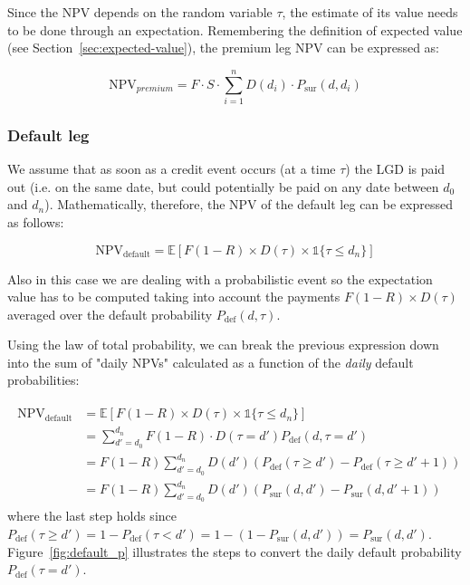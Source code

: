 Since the NPV depends on the random variable $\tau$, the estimate of its value needs to be done through an expectation.
Remembering the definition of expected value (see Section~\ref{sec:expected-value}), %
the premium leg NPV can be expressed as:

\begin{equation}
	\textrm{NPV}_{premium} = F\cdot S \cdot \sum_{i=1}^{n} D(d_i) \cdot P_{\textrm{sur}}(d, d_i)
\end{equation}

\subsubsection{Default leg}\label{default-leg}

We assume that as soon as a credit event occurs (at a time $\tau$) the LGD is paid out (i.e. on the same date, but could potentially be paid on any date between \(d_0\) and \(d_n\)). Mathematically, therefore, the NPV of the default leg can be expressed as follows:

\begin{equation}
\mathrm{NPV_{default}} =\mathbb{E}[F(1-R) \times D(\tau) \times \mathbb{1} \{\tau \leq d_n\} ]
\end{equation}

Also in this case we are dealing with a probabilistic event so the expectation value has to be computed taking into account the payments $F(1-R)\times D(\tau)$ averaged over the default probability $P_{\textrm{def}}(d, \tau)$. 

Using the law of total probability, we can break the previous expression down into the sum of "daily NPVs" calculated as a function of the \emph{daily} default probabilities:

\begin{align}
\begin{split}
\mathrm{NPV_{default}} &= \mathbb{E}[F(1-R) \times D(\tau) \times \mathbb{1}\{\tau \leq d_n\} ] \\
&= \sum_{d'=d_0}^{d_n} F(1-R) \cdot D(\tau = d') P_{\textrm{def}}(d, \tau = d') \\
&= F(1-R) \sum_{d'=d_0}^{d_n} D(d') \left(P_{\textrm{def}}(\tau \geq d') - P_{\textrm{def}}( \tau \geq d'+1) \right) \\
&= F(1-R) \sum_{d'=d_0}^{d_n} D(d') \left( P_{\textrm{sur}}(d, d') - P_{\textrm{sur}}(d, d'+1) \right)
\end{split}
\end{align}
where the last step holds since $P_{\textrm{def}}(\tau\geq d') = 1 - P_{\textrm{def}}(\tau < d') = 1 - (1-P_{\textrm{sur}}(d, d')) = P_{\textrm{sur}}(d, d')$. 
Figure~\ref{fig:default_p} illustrates the steps to convert the daily default probability $P_{\textrm{def}}(\tau=d')$.

